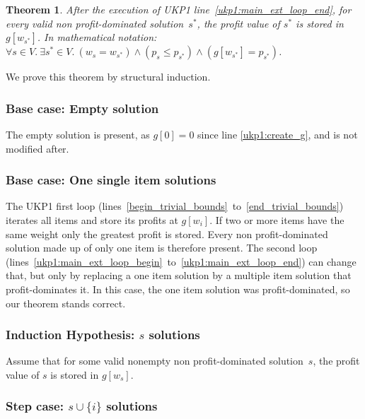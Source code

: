 \documentclass[12pt]{article}
\newtheorem{theorem}{Theorem}
\begin{document}
\begin{theorem}\label{theo:ukp1:all_relevant_solutions_present}
After the execution of UKP1 line~\ref{ukp1:main_ext_loop_end}, for every valid non profit-dominated solution~\(s^*\), the profit value of \(s^*\) is stored in \(g[w_{s^*}]\). In mathematical notation: \(\forall s \in V.~\exists s^* \in V.~(w_s = w_{s^*}) \land (p_s \leq p_{s^*}) \land (g[w_{s^*}] = p_{s^*})\).
\end{theorem}

We prove this theorem by structural induction.

\subsubsection{Base case: Empty solution}

The empty solution is present, as \(g[0] = 0\) since line \ref{ukp1:create_g}, and is not modified after.

\subsubsection{Base case: One single item solutions}

The UKP1 first loop (lines~\ref{begin_trivial_bounds}~to~\ref{end_trivial_bounds}) iterates all items and store its profits at \(g[w_i]\). If two or more items have the same weight only the greatest profit is stored. Every non profit-dominated solution made up of only one item is therefore present. The second loop (lines~\ref{ukp1:main_ext_loop_begin}~to~\ref{ukp1:main_ext_loop_end}) can change that, but only by replacing a one item solution by a multiple item solution that profit-dominates it. In this case, the one item solution was profit-dominated, so our theorem stands correct.

\subsubsection{Induction Hypothesis: \(s\) solutions}

Assume that for some valid nonempty non profit-dominated solution~\(s\), the profit value of \(s\) is stored in \(g[w_s]\).

\subsubsection{Step case: \(s \cup \{i\}\) solutions}
\end{document}
